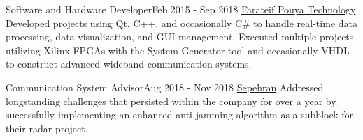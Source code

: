     \resumeSubheading
      {Software and Hardware Developer}{Feb 2015 - Sep 2018}
      {\href{https://iranlabexpo.ir/en/company/2983/Farateif-Pouya-Technology}{Farateif Pouya Technology}}{}
        \resumeItemListStart
          {Developed projects using Qt, C++, and occasionally C\# to handle real-time data processing, data visualization, and GUI management.}
          {Executed multiple projects utilizing Xilinx FPGAs with the System Generator tool and occasionally VHDL to construct advanced wideband communication systems.}
        \resumeItemListEnd

    \resumeSubheading
      {Communication System Advisor}{Aug 2018 - Nov 2018}
      {\href{https://www.linkedin.com/company/sepehran-company/}{Sepehran}}{}
      \resumeItemListStart
          {Addressed longstanding challenges that persisted within the company for over a year by successfully implementing an enhanced anti-jamming algorithm as a subblock for their radar project.}
      \resumeItemListEnd

  \resumeSubHeadingListEnd